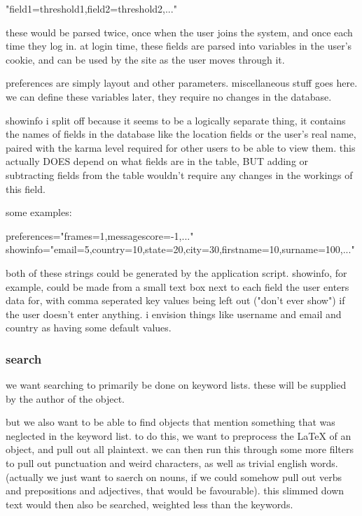  "field1=threshold1,field2=threshold2,..."

these would be parsed twice, once when the user joins the system, and once each time they log in.  at login time, these fields are parsed into variables in the user's cookie, and can be used by the site as the user moves through it.

preferences are simply layout and other parameters. miscellaneous stuff goes here.  we can define these variables later, they require no changes in the database.

showinfo i split off because it seems to be a logically separate thing, it contains the names of fields in the database like the location fields or the user's real name, paired with the karma level required for other users to be able to view them. this actually DOES depend on what fields are in the table, BUT adding or subtracting fields from the table wouldn't require any changes in the workings of this field.

some examples:

 preferences="frames=1,messagescore=-1,..."
 showinfo="email=5,country=10,state=20,city=30,firstname=10,surname=100,..."

both of these strings could be generated by the application script. showinfo, for example, could be made from a small text box next to each field the user enters data for, with comma seperated key values being left out ("don't ever show") if the user doesn't enter anything. i envision things like username and  email and country as having some default 
values. 


\subsubsection*{search}

we want searching to primarily be done on keyword lists.  these will be supplied by the author of the object.

but we also want to be able to find objects that mention something that was neglected in the keyword list. to do this, we want to preprocess the LaTeX of an object, and pull out all plaintext.  we can then run this through some more filters to pull out punctuation and weird characters, as well as trivial english words. (actually we just want to saerch on nouns, if we could somehow pull out verbs and prepositions and adjectives, that would be favourable).  this slimmed down text would then also be searched, weighted less than the keywords.


